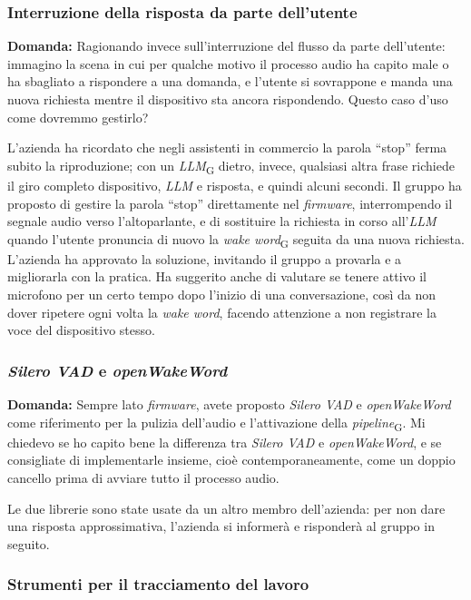 \documentclass[12pt,a4paper]{article}
\newcommand{\gl}[1]{\emph{#1}\textsubscript{\scriptsize G}}
\begin{document}
\subsubsection{Interruzione della risposta da parte dell'utente}

\textbf{Domanda:} Ragionando invece sull'interruzione del flusso da parte dell'utente: immagino la scena in cui per qualche motivo il processo audio ha capito male o ha sbagliato a rispondere a una domanda, e l'utente si sovrappone e manda una nuova richiesta mentre il dispositivo sta ancora rispondendo. Questo caso d'uso come dovremmo gestirlo?

L'azienda ha ricordato che negli assistenti in commercio la parola ``stop'' ferma subito la riproduzione; con un \gl{LLM} dietro, invece, qualsiasi altra frase richiede il giro completo dispositivo, \emph{LLM} e risposta, e quindi alcuni secondi. Il gruppo ha proposto di gestire la parola ``stop'' direttamente nel \emph{firmware}, interrompendo il segnale audio verso l'altoparlante, e di sostituire la richiesta in corso all'\emph{LLM} quando l'utente pronuncia di nuovo la \gl{wake word} seguita da una nuova richiesta. L'azienda ha approvato la soluzione, invitando il gruppo a provarla e a migliorarla con la pratica. Ha suggerito anche di valutare se tenere attivo il microfono per un certo tempo dopo l'inizio di una conversazione, così da non dover ripetere ogni volta la \emph{wake word}, facendo attenzione a non registrare la voce del dispositivo stesso.

\subsubsection{\texorpdfstring{\emph{Silero VAD} e \emph{openWakeWord}}{Silero VAD e openWakeWord}}

\textbf{Domanda:} Sempre lato \emph{firmware}, avete proposto \emph{Silero VAD} e \emph{openWakeWord} come riferimento per la pulizia dell'audio e l'attivazione della \gl{pipeline}. Mi chiedevo se ho capito bene la differenza tra \emph{Silero VAD} e \emph{openWakeWord}, e se consigliate di implementarle insieme, cioè contemporaneamente, come un doppio cancello prima di avviare tutto il processo audio.

Le due librerie sono state usate da un altro membro dell'azienda: per non dare una risposta approssimativa, l'azienda si informerà e risponderà al gruppo in seguito.

\subsubsection{Strumenti per il tracciamento del lavoro}
\end{document}
